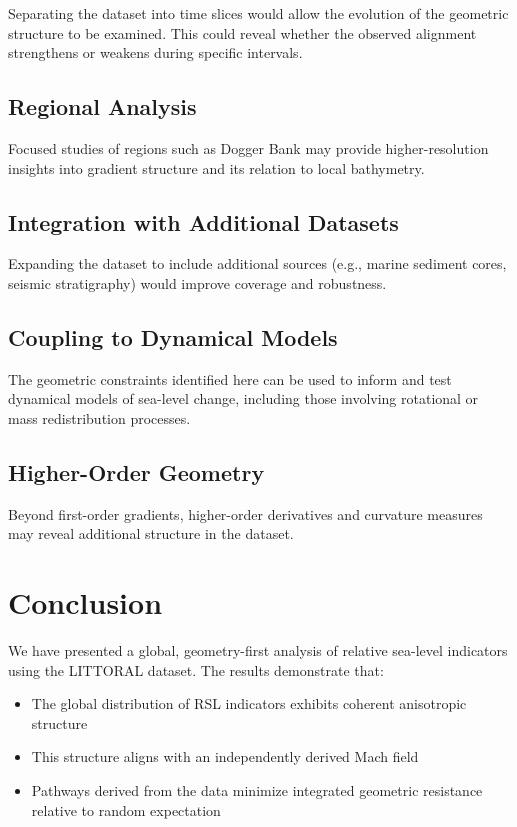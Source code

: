 \documentclass[twocolumn]{article}
\begin{document}
Separating the dataset into time slices would allow the evolution of the geometric structure to be examined. This could reveal whether the observed alignment strengthens or weakens during specific intervals.

\subsection{Regional Analysis}

Focused studies of regions such as Dogger Bank may provide higher-resolution insights into gradient structure and its relation to local bathymetry.

\subsection{Integration with Additional Datasets}

Expanding the dataset to include additional sources (e.g., marine sediment cores, seismic stratigraphy) would improve coverage and robustness.

\subsection{Coupling to Dynamical Models}

The geometric constraints identified here can be used to inform and test dynamical models of sea-level change, including those involving rotational or mass redistribution processes.

\subsection{Higher-Order Geometry}

Beyond first-order gradients, higher-order derivatives and curvature measures may reveal additional structure in the dataset.

\section{Conclusion}

We have presented a global, geometry-first analysis of relative sea-level indicators using the LITTORAL dataset. The results demonstrate that:

\begin{itemize}
\item The global distribution of RSL indicators exhibits coherent anisotropic structure
\item This structure aligns with an independently derived Mach field
\item Pathways derived from the data minimize integrated geometric resistance relative to random expectation
\end{itemize}
\end{document}
